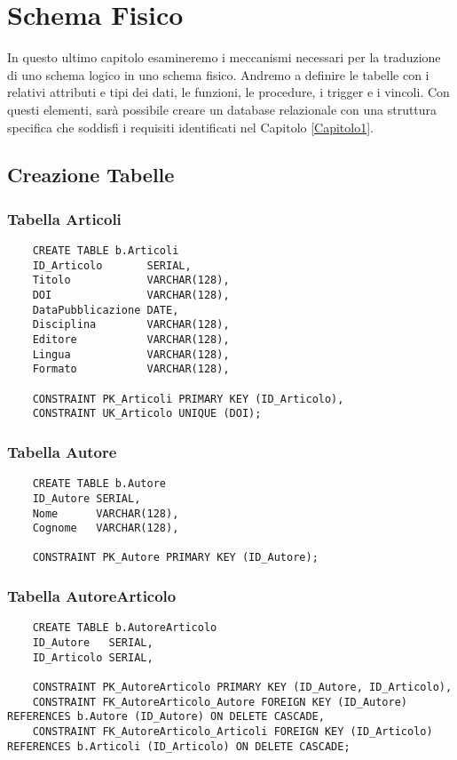 \chapter{Schema Fisico}

In questo ultimo capitolo esamineremo i meccanismi necessari per la traduzione di uno schema logico 
in uno schema fisico. Andremo a definire le tabelle con i relativi attributi e tipi dei dati, le
funzioni, le procedure, i trigger e i vincoli. Con questi elementi, sarà possibile creare un database
relazionale con una struttura specifica che soddisfi i requisiti identificati nel Capitolo \ref{Capitolo1}.

\section{Creazione Tabelle}
\subsection{Tabella Articoli}
\begin{lstlisting}
    CREATE TABLE b.Articoli
    ID_Articolo       SERIAL,
    Titolo            VARCHAR(128),
    DOI               VARCHAR(128),
    DataPubblicazione DATE,
    Disciplina        VARCHAR(128),
    Editore           VARCHAR(128),
    Lingua            VARCHAR(128),
    Formato           VARCHAR(128),

    CONSTRAINT PK_Articoli PRIMARY KEY (ID_Articolo),
    CONSTRAINT UK_Articolo UNIQUE (DOI);
\end{lstlisting}
\subsection{Tabella Autore}
\begin{lstlisting}
    CREATE TABLE b.Autore
    ID_Autore SERIAL,
    Nome      VARCHAR(128),
    Cognome   VARCHAR(128),

    CONSTRAINT PK_Autore PRIMARY KEY (ID_Autore);
\end{lstlisting}
\subsection{Tabella AutoreArticolo}
\begin{lstlisting}
    CREATE TABLE b.AutoreArticolo
    ID_Autore   SERIAL,
    ID_Articolo SERIAL,

    CONSTRAINT PK_AutoreArticolo PRIMARY KEY (ID_Autore, ID_Articolo),
    CONSTRAINT FK_AutoreArticolo_Autore FOREIGN KEY (ID_Autore) REFERENCES b.Autore (ID_Autore) ON DELETE CASCADE,
    CONSTRAINT FK_AutoreArticolo_Articoli FOREIGN KEY (ID_Articolo) REFERENCES b.Articoli (ID_Articolo) ON DELETE CASCADE;
\end{lstlisting}

